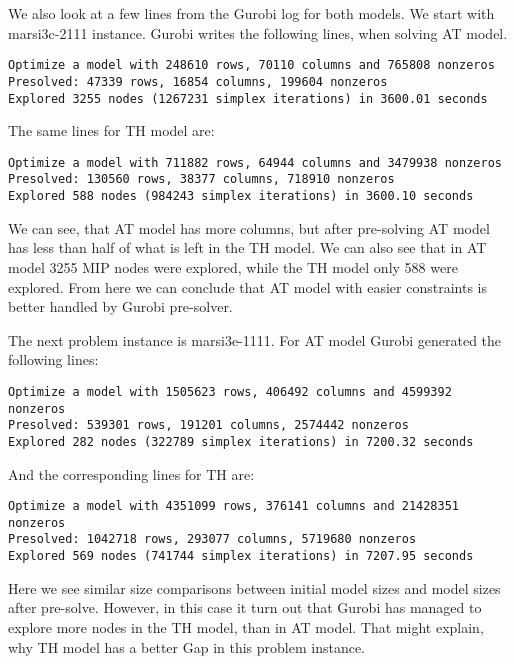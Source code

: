 We also look at a few lines from the Gurobi log for both models.
We start with marsi3c-2111 instance. Gurobi writes the following lines, when
solving AT model.
\begin{verbatim}
Optimize a model with 248610 rows, 70110 columns and 765808 nonzeros
Presolved: 47339 rows, 16854 columns, 199604 nonzeros
Explored 3255 nodes (1267231 simplex iterations) in 3600.01 seconds
\end{verbatim}
The same lines for TH model are:
\begin{verbatim}
Optimize a model with 711882 rows, 64944 columns and 3479938 nonzeros
Presolved: 130560 rows, 38377 columns, 718910 nonzeros
Explored 588 nodes (984243 simplex iterations) in 3600.10 seconds
\end{verbatim}
We can see, that AT model has more columns, but after pre-solving AT model has
less than half of what is left in the TH model. We can also see that in AT
model 3255 MIP nodes were explored, while the TH model only 588 were explored.
From here we can conclude that AT model with easier constraints is better
handled by Gurobi pre-solver.

The next problem instance is marsi3e-1111. For AT model Gurobi generated the
following lines:
\begin{verbatim}
Optimize a model with 1505623 rows, 406492 columns and 4599392 nonzeros
Presolved: 539301 rows, 191201 columns, 2574442 nonzeros
Explored 282 nodes (322789 simplex iterations) in 7200.32 seconds
\end{verbatim}
And the corresponding lines for TH are:
\begin{verbatim}
Optimize a model with 4351099 rows, 376141 columns and 21428351 nonzeros
Presolved: 1042718 rows, 293077 columns, 5719680 nonzeros
Explored 569 nodes (741744 simplex iterations) in 7207.95 seconds
\end{verbatim}
Here we see similar size comparisons between initial model sizes and model
sizes after pre-solve. However, in this case it turn out that Gurobi has
managed to explore more nodes in the TH model, than in AT model. That might
explain, why TH model has a better Gap in this problem instance. 
